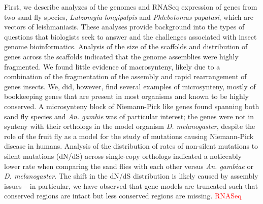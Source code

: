 First, we describe analyzes of the genomes and RNASeq expression of genes from two sand fly species, \emph{Lutzomyia longipalpis} and \emph{Phlebotomus papatasi}, which are vectors of leishmaniasis. These analyses provide background into the types of questions that biologists seek to answer and the challenges associated with insect genome bioinformatics. Analysis of the size of the scaffolds and distribution of genes across the scaffolds indicated that the genome assemblies were highly fragmented.  We found little evidence of macrosynteny, likely due to a combination of the fragmentation of the assembly and rapid rearrangement of genes insects.  We, did, however, find several examples of microsynteny, mostly of bookkeeping genes that are present in most organisms and known to be highly conserved.  A microsynteny block of Niemann-Pick like genes found spanning both sand fly species and \emph{An. gambie} was of particular interest; the genes were not in synteny with their orthologs in the model organism \emph{D. melanogaster}, despite the role of the fruit fly as a model for the study of mutations causing Niemann-Pick disease in humans. Analysis of the distribution of rates of non-silent mutations to silent mutations (dN/dS) across single-copy orthologs indicated a noticeably lower rate when comparing the sand flies with each other versus \emph{An. gambiae} or \emph{D. melanogaster}.    The shift in the dN/dS distribution is likely caused by assembly issues -- in particular, we have observed that gene models are truncated such that conserved regions are intact but less conserved regions are missing. \textcolor{red}{RNASeq}

